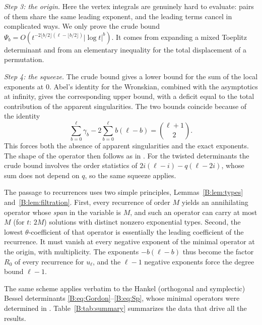 \documentclass[11pt,a4paper]{article}
\theoremstyle{definition}
\theoremstyle{remark}
\newcommand{\fl}[1]{\lfloor #1\rfloor}
\numberwithin{equation}{section}
\begin{document}
\emph{Step 3: the origin.} Here the vertex integrals are genuinely hard to evaluate: pairs of them share the same leading exponent, and the leading terms cancel in complicated ways. We only prove the crude bound $\Psi_b=O(t^{-2\fl{b/2}(\ell-\fl{b/2})}|\log t|^b)$. It comes from expanding a mixed Toeplitz determinant and from an elementary inequality for the total displacement of a permutation.

\emph{Step 4: the squeeze.} The crude bound gives a lower bound for the sum of the local exponents at $0$. Abel's identity for the Wronskian, combined with the asymptotics at infinity, gives the corresponding upper bound, with a deficit equal to the total contribution of the apparent singularities. The two bounds coincide because of the identity
\[
\sum_{b=0}^{\ell}\gamma_b-2\sum_{b=0}^{\ell}b(\ell-b)=\binom{\ell+1}{2}.
\]
This forces both the absence of apparent singularities and the exact exponents. The shape of the operator then follows as in \cite{Kei26}. For the twisted determinants the crude bound involves the order statistics of $2i(\ell-i)-q(\ell-2i)$, whose sum does not depend on $q$, so the same squeeze applies.

The passage to recurrences uses two simple principles, Lemmas~\ref{B:lem:types} and~\ref{B:lem:filtration}. First, every recurrence of order $M$ yields an annihilating operator whose \emph{span} in the variable is $M$, and such an operator can carry at most $M$ (for $t$: $2M$) solutions with distinct nonzero exponential types. Second, the lowest $\theta$-coefficient of that operator is essentially the leading coefficient of the recurrence. It must vanish at every negative exponent of the minimal operator at the origin, with multiplicity. The exponents $-b(\ell-b)$ thus become the factor $R_0$ of every recurrence for $u_\ell$, and the $\ell-1$ negative exponents force the degree bound $\ell-1$.

The same scheme applies verbatim to the Hankel (orthogonal and symplectic) Bessel determinants \eqref{B:eq:Gordon}--\eqref{B:eq:Sp}, whose minimal operators were determined in \cite{Kei26}. Table~\ref{B:tab:summary} summarizes the data that drive all the results.
\end{document}
